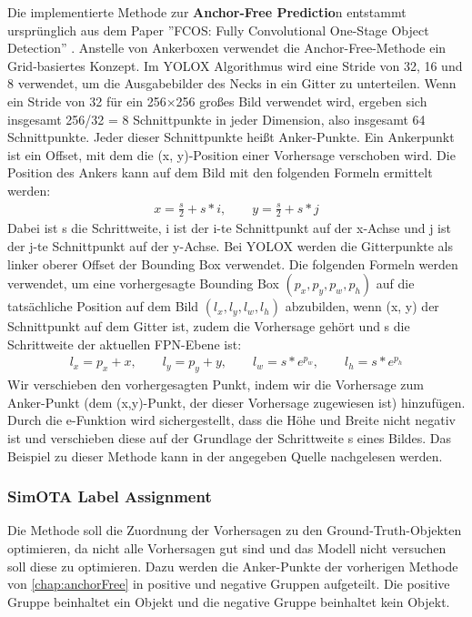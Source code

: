 Die implementierte Methode zur \textbf{Anchor-Free Predictio}n entstammt ursprünglich aus dem Paper ''FCOS: Fully Convolutional One-Stage Object Detection'' \cite{yoloxAnchorFree}. Anstelle von Ankerboxen verwendet die Anchor-Free-Methode ein Grid-basiertes Konzept. Im YOLOX Algorithmus wird eine Stride von 32, 16 und 8 verwendet, um die Ausgabebilder des Necks in ein Gitter zu unterteilen. Wenn ein Stride von 32 für ein 256×256 großes Bild verwendet wird, ergeben sich insgesamt 256/32 = 8 Schnittpunkte in jeder Dimension, also insgesamt 64 Schnittpunkte. Jeder dieser Schnittpunkte heißt Anker-Punkte. Ein Ankerpunkt ist ein Offset, mit dem die (x, y)-Position einer Vorhersage verschoben wird. Die Position des Ankers kann auf dem Bild mit den folgenden Formeln ermittelt werden:
\begin{align}
	x = \frac{s}{2} + s*i, \qquad y = \frac{s}{2} + s*j
\end{align}
Dabei ist s die Schrittweite, i ist der i-te Schnittpunkt auf der x-Achse und j ist der j-te Schnittpunkt auf der y-Achse. Bei YOLOX werden die Gitterpunkte als linker oberer Offset der Bounding Box verwendet. Die folgenden Formeln werden verwendet, um eine vorhergesagte Bounding Box $(p_x, p_y, p_w, p_h)$ auf die tatsächliche Position auf dem Bild $(l_x, l_y, l_w, l_h)$ abzubilden, wenn (x, y) der Schnittpunkt auf dem Gitter ist, zudem die Vorhersage gehört und s die Schrittweite der aktuellen FPN-Ebene ist:
\begin{align}
	l_x=p_x+x, \qquad l_y=p_y+y, \qquad l_w=s*e^{p_w}, \qquad l_h=s*e^{p_h}
\end{align}
Wir verschieben den vorhergesagten Punkt, indem wir die Vorhersage zum Anker-Punkt (dem (x,y)-Punkt, der dieser Vorhersage zugewiesen ist) hinzufügen. Durch die e-Funktion wird sichergestellt, dass die Höhe und Breite nicht negativ ist und verschieben diese auf der Grundlage der Schrittweite s eines Bildes. Das Beispiel zu dieser Methode kann in der angegeben Quelle nachgelesen werden. \cite{yoloxExplanationHowWorks}


\subsubsection{SimOTA Label Assignment}\label{chap:simota}
Die Methode soll die Zuordnung der Vorhersagen zu den Ground-Truth-Objekten optimieren, da nicht alle Vorhersagen gut sind und das Modell nicht versuchen soll diese zu optimieren. Dazu werden die Anker-Punkte der vorherigen Methode von \ref{chap:anchorFree} in positive und negative Gruppen aufgeteilt. Die positive Gruppe beinhaltet ein Objekt und die negative Gruppe beinhaltet kein Objekt.

